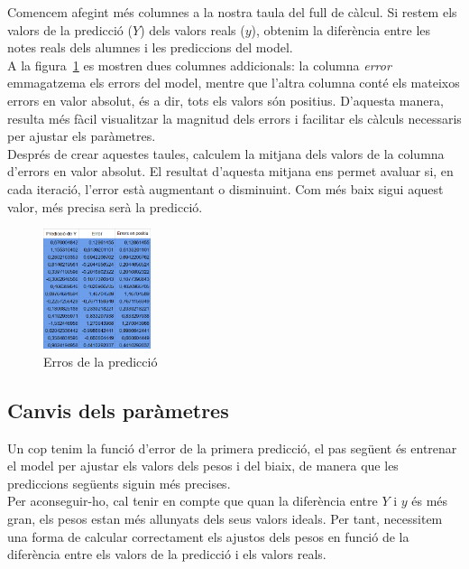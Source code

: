 Comencem afegint més columnes a la nostra taula del full de càlcul. Si restem els valors de la predicció ($Y$) dels valors reals ($y$), obtenim la diferència entre les notes reals dels alumnes i les prediccions del model.\\

A la figura~\ref{f:errors} es mostren dues columnes addicionals: la columna \textit{error} emmagatzema els errors del model, mentre que l’altra columna conté els mateixos errors en valor absolut, és a dir, tots els valors són positius. D’aquesta manera, resulta més fàcil visualitzar la magnitud dels errors i facilitar els càlculs necessaris per ajustar els paràmetres.\\

Després de crear aquestes taules, calculem la mitjana dels valors de la columna d’errors en valor absolut. El resultat d’aquesta mitjana ens permet avaluar si, en cada iteració, l’error està augmentant o disminuint. Com més baix sigui aquest valor, més precisa serà la predicció.

\begin{figure}[h!]
    \centering
    \includegraphics[width=0.28\textwidth]{./figures/Errors.png}
    \caption{Erros de la predicció}
    \label{f:errors}
\end{figure}

\subsection{Canvis dels paràmetres}
Un cop tenim la funció d’error de la primera predicció, el pas següent és entrenar el model per ajustar els valors dels pesos i del biaix, de manera que les prediccions següents siguin més precises.\\

Per aconseguir-ho, cal tenir en compte que quan la diferència entre $Y$ i $y$ és més gran, els pesos estan més allunyats dels seus valors ideals. Per tant, necessitem una forma de calcular correctament els ajustos dels pesos en funció de la diferència entre els valors de la predicció i els valors reals.\\

